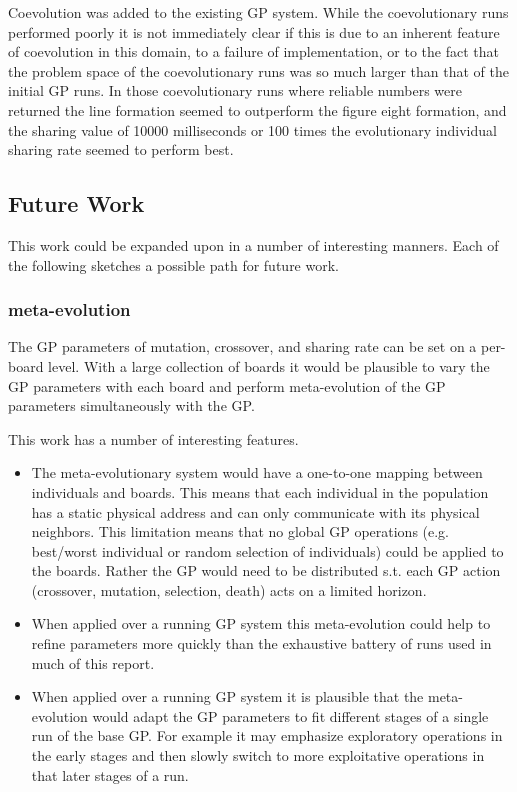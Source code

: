 \documentclass[11pt]{article}
\begin{document}
Coevolution was added to the existing GP system.  While the
coevolutionary runs performed poorly it is not immediately clear if
this is due to an inherent feature of coevolution in this domain, to a
failure of implementation, or to the fact that the problem space of
the coevolutionary runs was so much larger than that of the initial GP
runs.  In those coevolutionary runs where reliable numbers were
returned the line formation seemed to outperform the figure eight
formation, and the sharing value of 10000 milliseconds or 100 times
the evolutionary individual sharing rate seemed to perform best.

\subsection*{Future Work}
\label{sec-1.7}

This work could be expanded upon in a number of interesting manners.
Each of the following sketches a possible path for future work.

\subsubsection*{meta-evolution}
\label{sec-1.7.1}

The GP parameters of mutation, crossover, and sharing rate can be set
on a per-board level.  With a large collection of boards it would be
plausible to vary the GP parameters with each board and perform
meta-evolution of the GP parameters simultaneously with the GP.

This work has a number of interesting features.
\begin{itemize}
\item The meta-evolutionary system would have a one-to-one mapping between
  individuals and boards.  This means that each individual in the
  population has a static physical address and can only communicate
  with its physical neighbors.  This limitation means that no global
  GP operations (e.g. best/worst individual or random selection of
  individuals) could be applied to the boards.  Rather the GP would
  need to be distributed s.t. each GP action (crossover, mutation,
  selection, death) acts on a limited horizon.
\item When applied over a running GP system this meta-evolution could help
  to refine parameters more quickly than the exhaustive battery of
  runs used in much of this report.
\item When applied over a running GP system it is plausible that the
  meta-evolution would adapt the GP parameters to fit different stages
  of a single run of the base GP.  For example it may emphasize
  exploratory operations in the early stages and then slowly switch to
  more exploitative operations in that later stages of a run.
\end{itemize}
\end{document}
